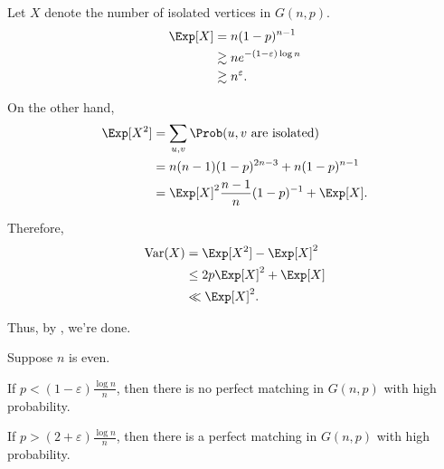 \begin{dem} Let $X$ denote the number of isolated vertices in $G(n, p)$.
	\begin{align*}
		\Exp[X] &= n(1-p)^{n-1} \\
				&\gtrsim ne^{-(1-\varepsilon)\log{n}}\\
				&\gtrsim n^\varepsilon.
	\end{align*}

	On the other hand, 
	\begin{align*}
		\Exp[X^2] &= \sum_{u, v} \Prob(u, v \text{ are isolated})\\
				  &= n(n-1)(1-p)^{2n-3} + n(1-p)^{n-1}\\
				  &= \Exp[X]^2 \frac{n-1}{n}(1-p)^{-1} + \Exp[X].
	\end{align*}

	Therefore, 
	\begin{align*}
		\Var(X) &= \Exp[X^2] - \Exp[X]^2\\
				&\le 2p\Exp[X]^2 + \Exp[X]\\
				&\ll \Exp[X]^2.
	\end{align*}

	Thus, by , we're done.
\end{dem}

\begin{thm}
	Suppose $n$ is even.

	If $p < (1-\varepsilon)\frac{\log{n}}{n}$, then there is no perfect matching in $G(n, p)$ with high probability.

	If $p > (2+\varepsilon)\frac{\log{n}}{n}$, then there is a perfect matching in $G(n, p)$ with high probability.
\end{thm}

